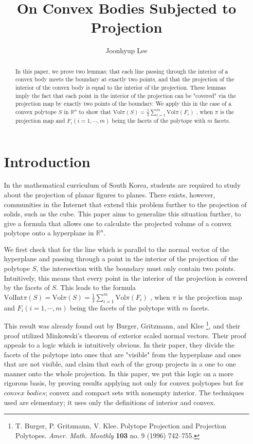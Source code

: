 \documentclass[a4paper]{article}
\title{On Convex Bodies Subjected to Projection}
\author{Joonhyup Lee}
\theoremstyle{definition}
\begin{document}
\maketitle

\begin{abstract}
In this paper, we prove two lemmas; that each line passing through the interior of a convex body meets the boundary at exactly two points, and that the projection of the interior of the convex body is equal to the interior of the projection. These lemmas imply the fact that each point in the interior of the projection can be "covered" via the projection map by exactly two points of the boundary. We apply this in the case of a convex polytope $S$ in $\mathbb{R}^n$ to show that $\mathrm{Vol}\pi(S)=\frac{1}{2}\sum\limits_{i=1}^m \mathrm{Vol}\pi(F_i)$ , when $\pi$ is the projection map and $F_i (i=1, \cdots ,m)$ being the facets of the polytope with $m$ facets.
\end{abstract}



\section{Introduction}

 In the mathematical curriculum of South Korea, students are required to study about the projection of planar figures to planes. There exists, however, communities in the Internet
 that extend this problem further to the projection of solids, such as the cube. This paper aims to generalize this situation further, to give a formula that allows one to calculate the projected volume of a convex polytope onto a hyperplane in $\mathbb{R}^n$.

We first check that for the line which is parallel to the normal vector of the hyperplane and passing through a point in the interior of the projection of the polytope $S$, the intersection with the boundary must only contain two points. Intuitively, this means that every point in the interior of the projection is covered by the facets of $S$. This leads to the formula $\mathrm{Vol}\mathrm{Int}\pi(S)=\mathrm{Vol}\pi(S)=\frac{1}{2}\sum\limits_{i=1}^m \mathrm{Vol}\pi(F_i)$ , when $\pi$ is the projection map and $F_i (i=1, \cdots ,m)$ being the facets of the polytope with $m$ facets.

This result was already found out by Burger, Gritzmann, and Klee \footnote{T. Burger, P. Gritzmann, V. Klee. Polytope Projection and Projection Polytopes. \textit{Amer. Math. Monthly} \textbf{103} no. 9 (1996) 742--755.}, and their proof utilized Minkowski's theorem of exterior scaled normal vectors. Their proof appeals to a logic which is intuitively obvious. In their paper, they divide the facets of the polytope into ones that are "visible" from the hyperplane and ones that are not visible, and claim that each of the group projects in a one to one manner onto the whole projection. In this paper, we put this logic on a more rigorous basis, by proving results applying not only for convex polytopes but for $\textit{convex bodies}$; convex and compact sets with nonempty interior. The techniques used are elementary; it uses only the definitions of interior and convex.
\end{document}
